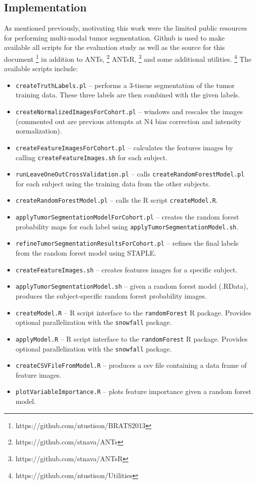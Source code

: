 \documentclass{llncs}
\begin{document}
\subsection{Implementation}

As mentioned previously, motivating this work were the limited public resources
for performing multi-modal tumor segmentation.  Github is used to make available all
scripts for the evaluation study as well as the source for this document%
\footnote{
https://github.com/ntustison/BRATS2013
}
in addition to ANTs,%
\footnote{
https://github.com/stnava/ANTs
}
ANTsR,%
\footnote{
https://github.com/stnava/ANTsR
}
and some additional utilities.%
\footnote{
https://github.com/ntustison/Utilities
}
The available scripts include:
\begin{itemize}
  \item \verb#createTruthLabels.pl# -- performs a 3-tissue segmentation of the tumor training data.  These three labels are then combined with the given labels. 
  \item \verb#createNormalizedImagesForCohort.pl# -- windows and rescales the images (commented out are previous attempts at N4 bias correction and intensity normalization).
  \item \verb#createFeatureImagesForCohort.pl# -- calculates the features images by calling \verb#createFeatureImages.sh# for each subject.
  \item \verb#runLeaveOneOutCrossValidation.pl#  -- calls \verb#createRandomForestModel.pl# for each subject using the training 
  data from the other subjects.
  \item \verb#createRandomForestModel.pl# -- calls the R script \verb#createModel.R#.
  \item \verb#applyTumorSegmentationModelForCohort.pl# -- creates the random
  forest probability maps for each label using \verb#applyTumorSegmentationModel.sh#.
  \item \verb#refineTumorSegmentationResultsForCohort.pl# -- refines the final labels from the random forest model using STAPLE.
  \item \verb#createFeatureImages.sh#  -- creates features images for a specific
  subject.
  \item \verb#applyTumorSegmentationModel.sh# -- given a random forest model (.RData), produces the subject-specific random forest probability images.
  \item \verb#createModel.R# -- R script interface to the \verb#randomForest# R package.  Provides optional parallelization with the \verb#snowfall# package.
  \item \verb#applyModel.R# -- R script interface to the \verb#randomForest# R package.  Provides optional parallelization with the \verb#snowfall# package.
  \item \verb#createCSVFileFromModel.R# -- produces a csv file containing a data frame of feature images.
  \item \verb#plotVariableImportance.R# -- plots feature importance given a random forest model.
\end{itemize}
\end{document}
